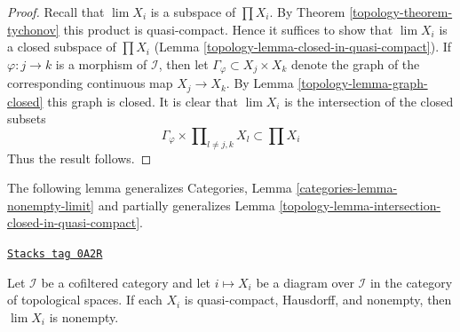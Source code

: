 \begin{proof}

Recall that $\lim X_i$ is a subspace of $\prod X_i$. By
Theorem \ref{topology-theorem-tychonov} this product is quasi-compact. Hence it
suffices to show that $\lim X_i$ is a closed subspace of $\prod X_i$
(Lemma \ref{topology-lemma-closed-in-quasi-compact}).
If $\varphi : j \to k$ is a morphism of $\mathcal{I}$, then
let $\Gamma_\varphi \subset X_j \times X_k$ denote the graph
of the corresponding continuous map $X_j \to X_k$. By
Lemma \ref{topology-lemma-graph-closed} this graph is closed.
It is clear that $\lim X_i$ is the intersection of the
closed subsets
$$
\Gamma_\varphi \times \prod\nolimits_{l \not = j, k} X_l
\subset \prod X_i
$$
Thus the result follows.
\end{proof}

The following lemma generalizes
Categories, Lemma \ref{categories-lemma-nonempty-limit}
and partially generalizes
Lemma \ref{topology-lemma-intersection-closed-in-quasi-compact}.

\begin{lemma}
\label{topology-lemma-nonempty-limit}
\href{https://stacks.math.columbia.edu/tag/0A2R}{\texttt{Stacks tag 0A2R}}

Let $\mathcal{I}$ be a cofiltered category and let $i \mapsto X_i$
be a diagram over $\mathcal{I}$ in the category of topological
spaces. If each $X_i$ is quasi-compact, Hausdorff, and nonempty, then
$\lim X_i$ is nonempty.
\end{lemma}


